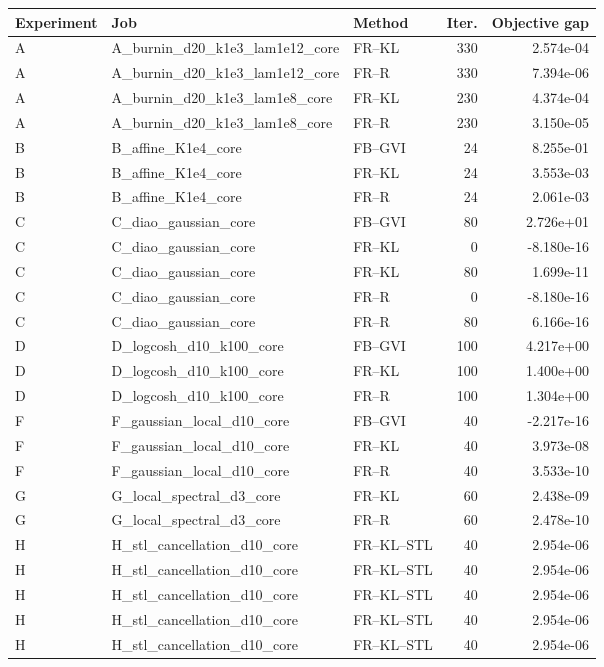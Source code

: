 \begin{tabular}{lllrr}
\toprule
Experiment & Job & Method & Iter. & Objective gap \\
\midrule
A & A_burnin_d20_k1e3_lam1e12_core & FR--KL & 330 & 2.574e-04 \\
A & A_burnin_d20_k1e3_lam1e12_core & FR--R & 330 & 7.394e-06 \\
A & A_burnin_d20_k1e3_lam1e8_core & FR--KL & 230 & 4.374e-04 \\
A & A_burnin_d20_k1e3_lam1e8_core & FR--R & 230 & 3.150e-05 \\
B & B_affine_K1e4_core & FB--GVI & 24 & 8.255e-01 \\
B & B_affine_K1e4_core & FR--KL & 24 & 3.553e-03 \\
B & B_affine_K1e4_core & FR--R & 24 & 2.061e-03 \\
C & C_diao_gaussian_core & FB--GVI & 80 & 2.726e+01 \\
C & C_diao_gaussian_core & FR--KL & 0 & -8.180e-16 \\
C & C_diao_gaussian_core & FR--KL & 80 & 1.699e-11 \\
C & C_diao_gaussian_core & FR--R & 0 & -8.180e-16 \\
C & C_diao_gaussian_core & FR--R & 80 & 6.166e-16 \\
D & D_logcosh_d10_k100_core & FB--GVI & 100 & 4.217e+00 \\
D & D_logcosh_d10_k100_core & FR--KL & 100 & 1.400e+00 \\
D & D_logcosh_d10_k100_core & FR--R & 100 & 1.304e+00 \\
F & F_gaussian_local_d10_core & FB--GVI & 40 & -2.217e-16 \\
F & F_gaussian_local_d10_core & FR--KL & 40 & 3.973e-08 \\
F & F_gaussian_local_d10_core & FR--R & 40 & 3.533e-10 \\
G & G_local_spectral_d3_core & FR--KL & 60 & 2.438e-09 \\
G & G_local_spectral_d3_core & FR--R & 60 & 2.478e-10 \\
H & H_stl_cancellation_d10_core & FR--KL--STL & 40 & 2.954e-06 \\
H & H_stl_cancellation_d10_core & FR--KL--STL & 40 & 2.954e-06 \\
H & H_stl_cancellation_d10_core & FR--KL--STL & 40 & 2.954e-06 \\
H & H_stl_cancellation_d10_core & FR--KL--STL & 40 & 2.954e-06 \\
H & H_stl_cancellation_d10_core & FR--KL--STL & 40 & 2.954e-06 \\

\end{tabular}
